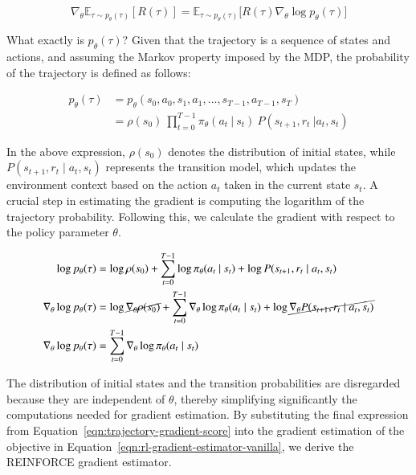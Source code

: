 \begin{equation}\label{eqn:rl-gradient-estimator-vanilla}
    \nabla_{\theta} \mathbb{E}_{\tau\sim p_{\theta}(\tau)}[R(\tau)] = \mathbb{E}_{\tau\sim p_{\theta}(\tau)}\big[R(\tau)\nabla_{\theta}\log p_{\theta}(\tau)\big]
\end{equation}    

\noindent What exactly is $p_{\theta}(\tau)$? Given that the trajectory is a sequence of states and actions, and assuming the Markov property imposed by the MDP, the probability of the trajectory is defined as follows:

\begin{equation}\label{eqn:trajectory-probability-expanded}
    \begin{split}
        p_{\theta}(\tau) &= p_\theta(s_{0}, a_{0}, s_{1}, a_{1}, \dots, s_{T-1}, a_{T-1}, s_{T}) \\
        &= \rho(s_0)~\prod_{t=0}^{T-1} \pi_{\theta}(a_{t}~|~s_{t})~P(s_{t+1}, r_{t}~|a_{t}, s_{t})
    \end{split}
\end{equation}

\noindent In the above expression, $\rho(s_{0})$ denotes the distribution of initial states, while $P(s_{t+1}, r_{t}\mid a_{t}, s_{t})$ represents the transition model, which updates the environment context based on the action $a_{t}$ taken in the current state $s_{t}$. A crucial step in estimating the gradient is computing the logarithm of the trajectory probability. Following this, we calculate the gradient with respect to the policy parameter $\theta$. 

\begin{equation}\label{eqn:trajectory-gradient-score}
    \begin{split}
        \log p_{\theta}(\tau) &= \log \rho(s_0) + \sum_{t=0}^{T-1}\log \pi_{\theta}(a_{t}~|~s_{t}) + \log P(s_{t+1}, r_{t}\mid a_{t}, s_{t}) \\
        \nabla_{\theta}\log p_{\theta}(\tau) &= \log \cancel{\nabla_{\theta}\rho(s_0)} + \sum_{t=0}^{T-1}\nabla_{\theta}\log \pi_{\theta}(a_{t}\mid s_{t}) + \log\cancel{\nabla_{\theta} P(s_{t+1}, r_{t}\mid a_{t}, s_{t})} \\
        \nabla_{\theta} \log p_{\theta}(\tau) &=  \sum_{t=0}^{T-1}\nabla_{\theta}\log \pi_{\theta}(a_{t}\mid s_{t}) 
    \end{split}
\end{equation}

\noindent The distribution of initial states and the transition
probabilities are disregarded because they are independent of $\theta$, thereby simplifying significantly the computations needed for gradient estimation. By substituting the final expression from Equation~\ref{eqn:trajectory-gradient-score} into the gradient estimation of the objective in Equation~\ref {eqn:rl-gradient-estimator-vanilla}, we derive the REINFORCE gradient estimator.

